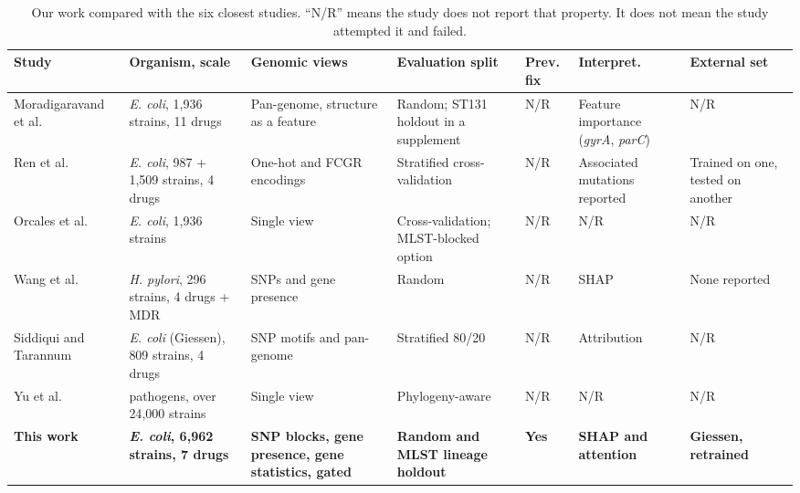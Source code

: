 \documentclass[conference]{IEEEtran}
\begin{document}
\begin{table}[t]
\caption{Our work compared with the six closest studies. ``N/R'' means the study
does not report that property. It does not mean the study attempted it and failed.}
\label{tab:related}
\centering
\small
\setlength{\tabcolsep}{4pt}
\renewcommand{\arraystretch}{1.25}
\begin{tabular}{|>{\raggedright\arraybackslash}p{2.4cm}|>{\raggedright\arraybackslash}p{2.2cm}|>{\raggedright\arraybackslash}p{2.9cm}|>{\raggedright\arraybackslash}p{2.5cm}|>{\centering\arraybackslash}p{1.4cm}|>{\raggedright\arraybackslash}p{1.9cm}|>{\raggedright\arraybackslash}p{1.7cm}|}
\hline
\rowcolor{headgrey}
\textbf{Study} & \textbf{Organism, scale} & \textbf{Genomic views} & \textbf{Evaluation split} & \textbf{Prev. fix} & \textbf{Interpret.} & \textbf{External set} \\ \hline
Moradigaravand et al. \cite{moradigaravand2018} & \textit{E. coli}, 1{,}936 strains, 11 drugs & Pan-genome, structure as a feature & Random; ST131 holdout in a supplement & N/R & Feature importance (\textit{gyrA}, \textit{parC}) & N/R \\ \hline
Ren et al. \cite{ren2022} & \textit{E. coli}, 987 + 1{,}509 strains, 4 drugs & One-hot and FCGR encodings & Stratified cross-validation & N/R & Associated mutations reported & Trained on one, tested on another \\ \hline
Orcales et al. \cite{orcales2024} & \textit{E. coli}, 1{,}936 strains & Single view & Cross-validation; MLST-blocked option & N/R & N/R & N/R \\ \hline
Wang et al. \cite{wang2025} & \textit{H. pylori}, 296 strains, 4 drugs + MDR & SNPs and gene presence & Random & N/R & SHAP & None reported \\ \hline
Siddiqui and Tarannum \cite{siddiqui2025} & \textit{E. coli} (Giessen), 809 strains, 4 drugs & SNP motifs and pan-genome & Stratified 80/20 & N/R & Attribution & N/R \\ \hline
Yu et al. \cite{yu2025} & 5 pathogens, over 24{,}000 strains & Single view & Phylogeny-aware & N/R & N/R & N/R \\ \hline
\rowcolor{oursblue}
\textbf{This work} & \textbf{\textit{E. coli}, 6{,}962 strains, 7 drugs} & \textbf{SNP blocks, gene presence, gene statistics, gated} & \textbf{Random and MLST lineage holdout} & \textbf{Yes} & \textbf{SHAP and attention} & \textbf{Giessen, retrained} \\ \hline
\end{tabular}
\renewcommand{\arraystretch}{1.0}
\end{table}
\end{document}
